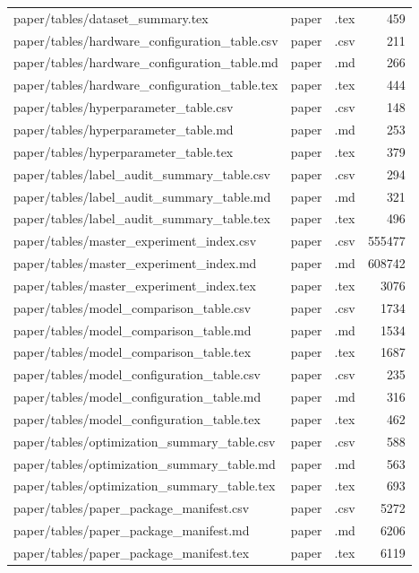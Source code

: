 \begin{tabular}{lllr}
paper/tables/dataset\_summary.tex & paper & .tex & 459 \\
paper/tables/hardware\_configuration\_table.csv & paper & .csv & 211 \\
paper/tables/hardware\_configuration\_table.md & paper & .md & 266 \\
paper/tables/hardware\_configuration\_table.tex & paper & .tex & 444 \\
paper/tables/hyperparameter\_table.csv & paper & .csv & 148 \\
paper/tables/hyperparameter\_table.md & paper & .md & 253 \\
paper/tables/hyperparameter\_table.tex & paper & .tex & 379 \\
paper/tables/label\_audit\_summary\_table.csv & paper & .csv & 294 \\
paper/tables/label\_audit\_summary\_table.md & paper & .md & 321 \\
paper/tables/label\_audit\_summary\_table.tex & paper & .tex & 496 \\
paper/tables/master\_experiment\_index.csv & paper & .csv & 555477 \\
paper/tables/master\_experiment\_index.md & paper & .md & 608742 \\
paper/tables/master\_experiment\_index.tex & paper & .tex & 3076 \\
paper/tables/model\_comparison\_table.csv & paper & .csv & 1734 \\
paper/tables/model\_comparison\_table.md & paper & .md & 1534 \\
paper/tables/model\_comparison\_table.tex & paper & .tex & 1687 \\
paper/tables/model\_configuration\_table.csv & paper & .csv & 235 \\
paper/tables/model\_configuration\_table.md & paper & .md & 316 \\
paper/tables/model\_configuration\_table.tex & paper & .tex & 462 \\
paper/tables/optimization\_summary\_table.csv & paper & .csv & 588 \\
paper/tables/optimization\_summary\_table.md & paper & .md & 563 \\
paper/tables/optimization\_summary\_table.tex & paper & .tex & 693 \\
paper/tables/paper\_package\_manifest.csv & paper & .csv & 5272 \\
paper/tables/paper\_package\_manifest.md & paper & .md & 6206 \\
paper/tables/paper\_package\_manifest.tex & paper & .tex & 6119 \\

\end{tabular}
